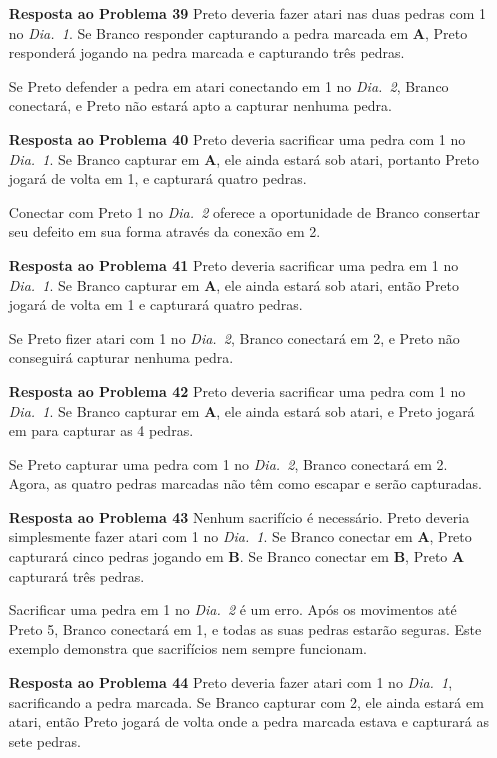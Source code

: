 \begin{itemize}
    \item[\textbf{Resposta ao Problema 39}] Preto deveria fazer atari nas duas pedras com 1 no \emph{Dia.\@~1}. Se Branco responder capturando a pedra marcada em \textbf{A}, Preto responderá jogando na pedra marcada e capturando três pedras.
    
        Se Preto defender a pedra em atari conectando em 1 no \emph{Dia.\@~2}, Branco conectará, e Preto não estará apto a capturar nenhuma pedra.
    \item[\textbf{Resposta ao Problema 40}] Preto deveria sacrificar uma pedra com 1 no \emph{Dia.\@~1}. Se Branco capturar em \textbf{A}, ele ainda estará sob atari, portanto Preto jogará de volta em 1, e capturará quatro pedras.
    
        Conectar com Preto 1 no \emph{Dia.\@~2} oferece a oportunidade de Branco consertar seu defeito em sua forma através da conexão em 2.
    \item[\textbf{Resposta ao Problema 41}] Preto deveria sacrificar uma pedra em 1 no \emph{Dia.\@~1}. Se Branco capturar em \textbf{A}, ele ainda estará sob atari, então Preto jogará de volta em 1 e capturará quatro pedras.
    
        Se Preto fizer atari com 1 no \emph{Dia.\@~2}, Branco conectará em 2, e Preto não conseguirá capturar nenhuma pedra.
    \item[\textbf{Resposta ao Problema 42}] Preto deveria sacrificar uma pedra com 1 no \emph{Dia.\@~1}. Se Branco capturar em \textbf{A}, ele ainda estará sob atari, e Preto jogará em para capturar as 4 pedras.
    
        Se Preto capturar uma pedra com 1 no \emph{Dia.\@~2}, Branco conectará em 2. Agora, as quatro pedras marcadas não têm como escapar e serão capturadas.
    \item[\textbf{Resposta ao Problema 43}] Nenhum sacrifício é necessário. Preto deveria simplesmente fazer atari com 1 no \emph{Dia.\@~1}. Se Branco conectar em \textbf{A}, Preto capturará cinco pedras jogando em \textbf{B}. Se Branco conectar em \textbf{B}, Preto \textbf{A} capturará três pedras.
    
        Sacrificar uma pedra em 1 no \emph{Dia.\@~2} é um erro. Após os movimentos até Preto 5, Branco conectará em 1, e todas as suas pedras estarão seguras. Este exemplo demonstra que sacrifícios nem sempre funcionam.
    \item[\textbf{Resposta ao Problema 44}] Preto deveria fazer atari com 1 no \emph{Dia.\@~1}, sacrificando a pedra marcada. Se Branco capturar com 2, ele ainda estará em atari, então Preto jogará de volta onde a pedra marcada estava e capturará as sete pedras.
    

\end{itemize}

